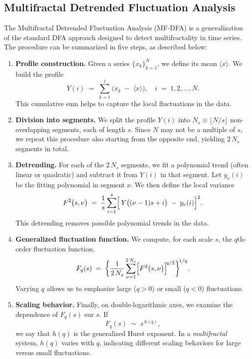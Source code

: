 \documentclass[11pt]{extarticle}
\begin{document}
\subsection{Multifractal Detrended Fluctuation Analysis}

The Multifractal Detrended Fluctuation Analysis (MF-DFA) is a generalization of the standard DFA approach designed to detect multifractality in time series. The procedure can be summarized in five steps, as described below:

\begin{enumerate}
    \item \textbf{Profile construction.} Given a series $\{x_k\}_{k=1}^N$, we define its mean $\langle x \rangle$. We build the profile
    \[
        Y(i) \;=\; \sum_{k=1}^{i} \bigl(x_k \;-\; \langle x \rangle\bigr),
        \quad i \;=\; 1,2,\dots,N.
    \]
    This cumulative sum helps to capture the local fluctuations in the data.

    \item \textbf{Division into segments.} We split the profile $Y(i)$ into $N_s \equiv \lfloor N/s \rfloor$ non-overlapping segments, each of length $s$. Since $N$ may not be a multiple of $s$, we repeat this procedure also starting from the opposite end, yielding $2\,N_s$ segments in total.

    \item \textbf{Detrending.} For each of the $2\,N_s$ segments, we fit a polynomial trend (often linear or quadratic) and subtract it from $Y(i)$ in that segment. Let $y_\nu(i)$ be the fitting polynomial in segment $\nu$. We then define the local variance
    \[
        F^2\bigl(s,\nu\bigr)
        \;=\;
        \frac{1}{s}
        \sum_{i=1}^s
        \Bigl[\,Y\bigl((\nu-1)s + i\bigr)\;-\;y_\nu(i)\Bigr]^2.
    \]
    This detrending removes possible polynomial trends in the data.

    \item \textbf{Generalized fluctuation function.} We compute, for each scale $s$, the $q$th-order fluctuation function,
    \[
        F_q(s)
        \;=\;
        \biggl\{
          \frac{1}{2\,N_s}
          \sum_{\nu=1}^{2\,N_s}
          \Bigl[
            F^2\bigl(s,\nu\bigr)
          \Bigr]^{\!q/2}
        \biggr\}^{\!1/q}.
    \]
    Varying $q$ allows us to emphasize large ($q>0$) or small ($q<0$) fluctuations.

    \item \textbf{Scaling behavior.} Finally, on double-logarithmic axes, we examine the dependence of $F_q(s)$ sur $s$. If
    \[
        F_q(s) \;\sim\; s^{\,h(q)},
    \]
    we say that $h(q)$ is the generalized Hurst exponent. In a \emph{multifractal} system, $h(q)$ varies with $q$, indicating different scaling behaviors for large versus small fluctuations.
\end{enumerate}
\end{document}
